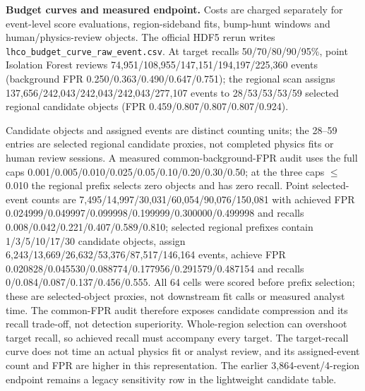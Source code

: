 \documentclass[11pt,a4paper]{article}
\numberwithin{equation}{section}
\theoremstyle{definition}\newtheorem{definition}[theorem]{Definition}
\theoremstyle{remark}\newtheorem{remark}[theorem]{Remark}
\begin{document}
\textbf{Budget curves and measured endpoint.} Costs are charged separately for event-level score evaluations, region-sideband fits, bump-hunt windows and human/physics-review objects. The official HDF5 rerun writes \texttt{lhco\_budget\_curve\_raw\_event.csv}. At target recalls 50/70/80/90/95\%, point Isolation Forest reviews 74,951/108,955/147,151/194,197/225,360 events (background FPR 0.250/0.363/0.490/0.647/0.751); the regional scan assigns 137,656/242,043/242,043/242,043/277,107 events to 28/53/53/53/59 selected regional candidate objects (FPR 0.459/0.807/0.807/0.807/0.924).\par Candidate objects and assigned events are distinct counting units; the 28--59 entries are selected regional candidate proxies, not completed physics fits or human review sessions. A measured common-background-FPR audit uses the full caps 0.001/0.005/0.010/0.025/0.05/0.10/0.20/0.30/0.50; at the three caps $\leq$0.010 the regional prefix selects zero objects and has zero recall. Point selected-event counts are 7,495/14,997/30,031/60,054/90,076/150,081 with achieved FPR 0.024999/0.049997/0.099998/0.199999/0.300000/0.499998 and recalls 0.008/0.042/0.221/0.407/0.589/0.810; selected regional prefixes contain 1/3/5/10/17/30 candidate objects, assign 6,243/13,669/26,632/53,376/87,517/146,164 events, achieve FPR 0.020828/0.045530/0.088774/0.177956/0.291579/0.487154 and recalls 0/0.084/0.087/0.137/0.456/0.555. All 64 cells were scored before prefix selection; these are selected-object proxies, not downstream fit calls or measured analyst time. The common-FPR audit therefore exposes candidate compression and its recall trade-off, not detection superiority. Whole-region selection can overshoot target recall, so achieved recall must accompany every target. The target-recall curve does not time an actual physics fit or analyst review, and its assigned-event count and FPR are higher in this representation. The earlier 3,864-event/4-region endpoint remains a legacy sensitivity row in the lightweight candidate table.
\end{document}
